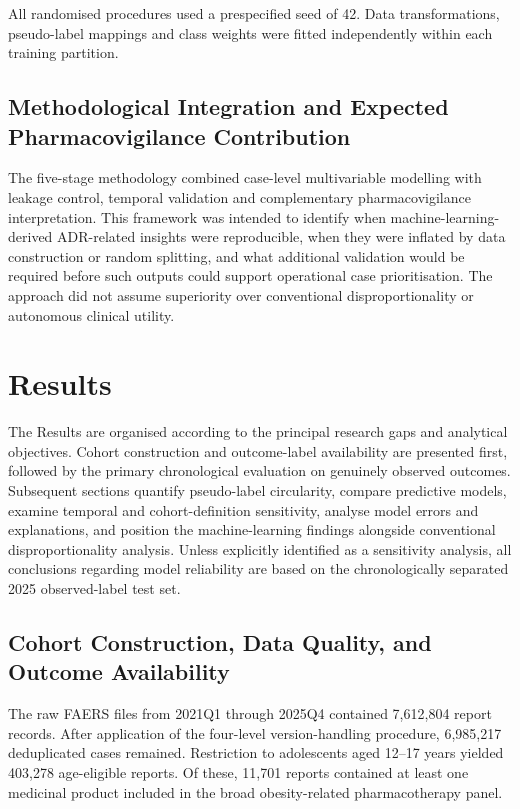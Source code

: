 \documentclass[10pt]{article}
\begin{document}
All randomised procedures used a prespecified seed of 42. Data transformations, pseudo-label mappings and class weights were fitted independently within each training partition.

\subsection{Methodological Integration and Expected Pharmacovigilance Contribution}
The five-stage methodology combined case-level multivariable modelling with leakage control, temporal validation and complementary pharmacovigilance interpretation. This framework was intended to identify when machine-learning-derived ADR-related insights were reproducible, when they were inflated by data construction or random splitting, and what additional validation would be required before such outputs could support operational case prioritisation. The approach did not assume superiority over conventional disproportionality or autonomous clinical utility.

\section{Results}
The Results are organised according to the principal research gaps and analytical objectives. Cohort construction and outcome-label availability are presented first, followed by the primary chronological evaluation on genuinely observed outcomes. Subsequent sections quantify pseudo-label circularity, compare predictive models, examine temporal and cohort-definition sensitivity, analyse model errors and explanations, and position the machine-learning findings alongside conventional disproportionality analysis. Unless explicitly identified as a sensitivity analysis, all conclusions regarding model reliability are based on the chronologically separated 2025 observed-label test set.

\subsection{Cohort Construction, Data Quality, and Outcome Availability}
The raw FAERS files from 2021Q1 through 2025Q4 contained 7,612,804 report records. After application of the four-level version-handling procedure, 6,985,217 deduplicated cases remained. Restriction to adolescents aged 12--17 years yielded 403,278 age-eligible reports. Of these, 11,701 reports contained at least one medicinal product included in the broad obesity-related pharmacotherapy panel.
\end{document}
